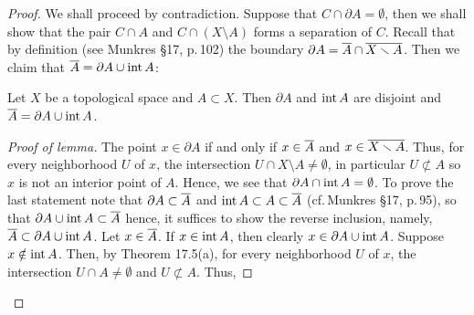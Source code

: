 \begin{proof}
We shall proceed by contradiction. Suppose that $C\cap\partial
A=\emptyset$, then we shall show that the pair $C\cap A$ and
$C\cap\left(X\setminus A\right)$ forms a separation of
$C$. Recall that by definition (see Munkres \S17, p.\,102) the
boundary $\partial A=\overline{A}\cap\overline{X\smallsetminus A}$. Then we
claim that $\overline{A}=\partial A\cup\operatorname{int} A$:
\begin{lemma}
Let $X$ be a topological space and $A\subset X$. Then $\partial
A$ and $\operatorname{int} A$ are disjoint and $\overline{A}=\partial A\cup\operatorname{int}
A$.
\end{lemma}
\begin{proof}[Proof of lemma]
\renewcommand\qedsymbol{$\clubsuit$}
The point $x\in\partial A$ if and only if $x\in\overline{A}$ and
$x\in\overline{X\smallsetminus A}$. Thus, for every neighborhood $U$ of
$x$, the intersection $U\cap X\setminus A\neq\emptyset$, in
particular $U\nsubset A$ so $x$ is not an interior point of
$A$. Hence, we see that $\partial A\cap\operatorname{int} A=\emptyset$. To
prove the last statement note that $\partial A\subset\overline{A}$ and
$\operatorname{int} A\subset A\subset\overline{A}$ (cf.\,Munkres \S17, p.\,95), so
that $\partial A\cup\operatorname{int} A\subset\overline{A}$ hence, it suffices to
show the reverse inclusion, namely, $\overline{A}\subset\partial
A\cup\operatorname{int} A$. Let $x\in\overline{A}$. If $x\in\operatorname{int} A$, then clearly
$x\in\partial A\cup\operatorname{int} A$. Suppose $x\notin\operatorname{int} A$. Then, by
Theorem 17.5(a), for every neighborhood $U$ of $x$, the
intersection $U\cap A\neq\emptyset$ and $U\nsubset A$. Thus,

\end{proof}
\end{proof}
